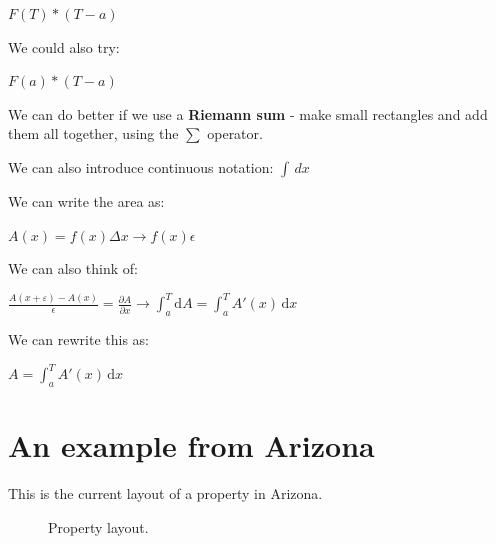\documentclass[12pt]{article}
\begin{document}
\(F(T)*(T-a)\)

We could also try:

\(F(a)*(T-a)\)

We can do better if we use a \textbf{Riemann sum} - make small rectangles and add them all together, using the \(\sum \) operator.

We can also introduce continuous notation: \( \int \, dx \)

We can write the area as:

\(A(x)=f(x) \Delta x \rightarrow f(x) \epsilon\)

We can also think of:

\( \frac{A(x+\varepsilon)-A(x)}{\epsilon} = \frac{ \partial A}{ \partial x} \rightarrow \int_a^T \mathrm{d}A = \int_a^T A'(x)\,\mathrm{d}x \)

We can rewrite this as:

\(A = \int_a^T A'(x)\,\mathrm{d}x\)

\section{An example from Arizona}

This is the current layout of a property in Arizona. 

\begin{figure}[h!]
\centering


\caption{Property layout.}
\label{fig:property_layout}

\end{figure}
\end{document}
